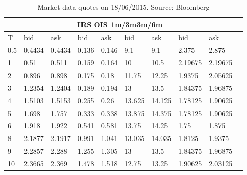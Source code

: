 \documentclass[12pt,a4paper]{article}
\theoremstyle{plain}
\numberwithin{equation}{section}
\begin{document}
\begin{table}[t]
\begin{center}
\begin{tabular}{|l|l|l|l|l|l|l|l|l|l|}

\hline
\multicolumn{9}{|c|}{\;\;\;\;\;\;\;\;\;\;\;\;\;\;\;IRS \;\;\;\;\;\;\;\; \;\;\;\;\;\;\;\;\;\;\;\;OIS \;\;\;\;\;\;\;\;\;\;\;\;1m/3m\;\;\;\;\;\;\;\;\;\;\;\;\;3m/6m} \\\hline
T& bid& ask& bid& ask& bid& ask& bid& ask\\ \hline
    0.5   & 0.4434 & 0.4434 & 0.136 & 0.146 & 9.1   & 9.1   & 2.375 & 2.875 \\
    1     & 0.51  & 0.511 & 0.159 & 0.164 & 10    & 10.5  & 2.19675 & 2.19675 \\
    2     & 0.896 & 0.898 & 0.175 & 0.18  & 11.75 & 12.25 & 1.9375 & 2.05625 \\
    3     & 1.2354 & 1.2404 & 0.189 & 0.194 & 13    & 13.5  & 1.84375 & 1.96875 \\
    4     & 1.5103 & 1.5153 & 0.255 & 0.26  & 13.625 & 14.125 & 1.78125 & 1.90625 \\
    5     & 1.698 & 1.757 & 0.333 & 0.338 & 13.875 & 14.375 & 1.78125 & 1.90625 \\
    6     & 1.918 & 1.922 & 0.541 & 0.581 & 13.75 & 14.25 & 1.75  & 1.875 \\
    8     & 2.1877 & 2.1917 & 0.991 & 1.041 & 13.035 & 14.035 & 1.8125 & 1.9375 \\
    9     & 2.2857 & 2.288 & 1.255 & 1.305 & 13    & 13.5  & 1.84375 & 1.96875 \\
    10    & 2.3665 & 2.369 & 1.478 & 1.518 & 12.75 & 13.25 & 1.90625 & 2.03125 \\
\hline
\end{tabular}\\[1ex]
\caption{Market data quotes on 18/06/2015. Source: Bloomberg }\label{Marketdata:20150618}
\end{center}
\end{table}
\end{document}
